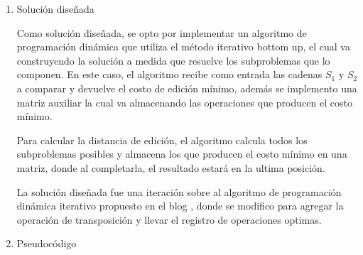 

\begin{enumerate}[1)]
    \item Solución diseñada
    
Como solución diseñada, se opto por implementar un algoritmo de programación
dinámica que utiliza el método iterativo bottom up, el cual va construyendo la
solución a medida que resuelve los subproblemas que lo componen. En este caso, el
algoritmo recibe como entrada las cadenas $S_1$ y $S_2$ a comparar y devuelve el costo de edición
mínimo, además se implemento una matriz auxiliar la cual va almacenando las operaciones
que producen el costo mínimo.

Para calcular la distancia de edición, el algoritmo calcula todos los subproblemas posibles
y almacena los que producen el costo mínimo en una matriz, donde al completarla,
el resultado estará en la ultima posición.

La solución diseñada fue una iteración sobre al algoritmo de programación dinámica iterativo
propuesto en el 
blog \citeauthor{EditDistance} \cite{EditDistance}
, donde se modifico para agregar la operación de transposición y llevar el registro
de operaciones optimas.

\item Pseudocódigo

\begin{algorithm}[H]
    \DontPrintSemicolon
    \footnotesize
\end{algorithm}
\end{enumerate}
